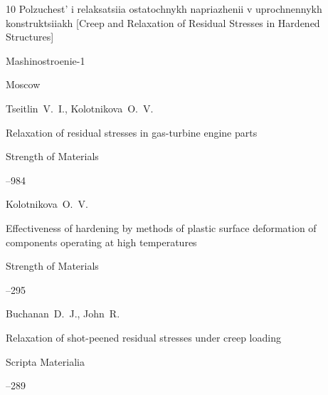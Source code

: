 \begin{thebibliography}{10}
\book Polzuchest' i relaksatsiia ostatochnykh napriazhenii v uprochnennykh konstruktsiiakh \rm [Creep and Relaxation of Residual Stresses in Hardened Structures]



\publ Mashinostroenie-1

\publaddr Moscow






\by Tseitlin~V.~I., Kolotnikova~O.~V.

\paper Relaxation of residual stresses in gas-turbine engine parts

\jour Strength of Materials




--984






\by Kolotnikova~O.~V.

\paper Effectiveness of hardening by methods of plastic surface deformation of components operating at high temperatures

\jour Strength of Materials




--295





\by Buchanan~D.~J., John~R.

\paper Relaxation of shot-peened residual stresses under creep loading

\jour Scripta Materialia




--289






\end{thebibliography}
